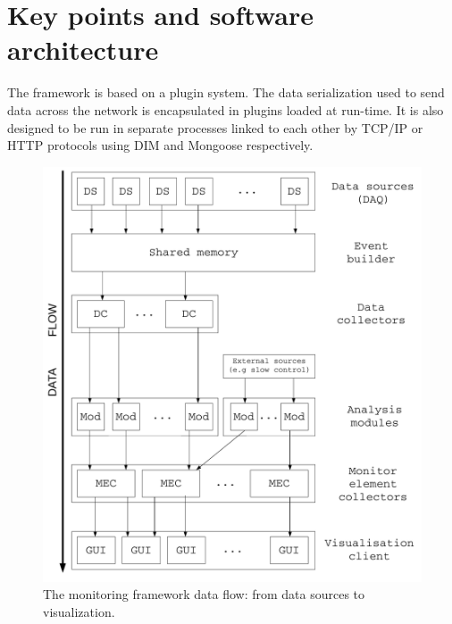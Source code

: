 \documentclass[conference]{IEEEtran}
\begin{document}
\section{Key points and software architecture}

The framework is based on a plugin system. The data serialization used to send data across the network is encapsulated in plugins loaded at run-time. It is also designed to be run in separate processes linked to each other by TCP/IP or HTTP protocols using DIM\cite{DIM} and Mongoose\cite{MONGOOSE} respectively.

\begin{figure}[htbp]
  \begin{center}
    \includegraphics[width=0.8\linewidth]{DQMWorkflow.pdf}
    \caption{\label{DQM_WORKFLOW}The monitoring framework data flow: from data sources to visualization.}
  \end{center}
  \vspace{-.9cm}
\end{figure}
\end{document}
